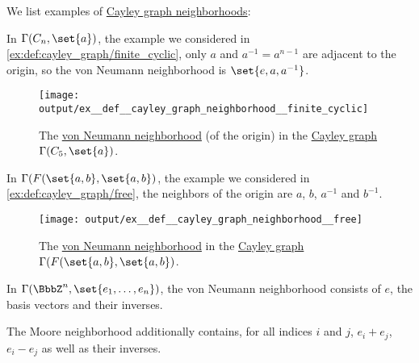\begin{example}\label{ex:def:cayley_graph_neighborhood}
  We list examples of \hyperref[def:cayley_graph_neighborhood]{Cayley graph neighborhoods}:
  \begin{thmenum}
     In \( \Gamma(C_n, \set{ a }) \), the example we considered in \cref{ex:def:cayley_graph/finite_cyclic}, only \( a \) and \( a^{-1} = a^{n-1} \) are adjacent to the origin, so the von Neumann neighborhood is \( \set{ e, a, a^{-1} } \).

    \begin{figure}[!ht]
      \centering
      \texttt{[image: output/ex\_\_def\_\_cayley\_graph\_neighborhood\_\_finite\_cyclic]}
      \caption{The \hyperref[def:cayley_graph_neighborhood/von_neumann]{von Neumann neighborhood} (of the origin) in the \hyperref[def:cayley_graph]{Cayley graph} \( \Gamma(C_5, \set{ a }) \).}\label{fig:ex:def:cayley_graph_neighborhood/finite_cyclic}
    \end{figure}

     In \( \Gamma(F(\set{ a, b }, \set{ a, b }) \), the example we considered in \cref{ex:def:cayley_graph/free}, the neighbors of the origin are \( a \), \( b \), \( a^{-1} \) and \( b^{-1} \).

    \begin{figure}[!ht]
      \centering
      \texttt{[image: output/ex\_\_def\_\_cayley\_graph\_neighborhood\_\_free]}
      \caption{The \hyperref[def:cayley_graph_neighborhood/von_neumann]{von Neumann neighborhood} in the \hyperref[def:cayley_graph]{Cayley graph} \( \Gamma(F(\set{ a, b }, \set{ a, b }) \).}\label{fig:ex:def:cayley_graph_neighborhood/free}
    \end{figure}

     In \( \Gamma(\BbbZ^n, \set{ e_1, \ldots, e_n }) \), the von Neumann neighborhood consists of \( e \), the basis vectors and their inverses.

    The Moore neighborhood additionally contains, for all indices \( i \) and \( j \), \( e_i + e_j \), \( e_i - e_j \) as well as their inverses.


\end{thmenum}
\end{example}
